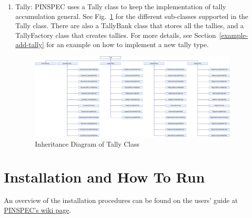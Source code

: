 \documentclass[titlepage]{article}
\newenvironment{Figure}[1][!t]
  {\begin{landscape}\thispagestyle{empty}\begin{figure}}
  {\end{figure}\null\vfill\centerline{\raisebox{-2cm}{\thepage}}\end{landscape}}
\begin{document}
\begin{enumerate}
\item Tally: PINSPEC uses a Tally class to keep the implementation of tally accumulation general. See Fig.~\ref{classTally} for the different sub-classes supported in the Tally class. There are also a TallyBank class that stores all the tallies, and a TallyFactory class that creates tallies. For more details, see Section~\ref{example-add-tally} for an example on how to implement a new tally type. 
  \begin{Figure}
    \vspace{-1in}
    \hspace{-1.45in}
    \includegraphics[width=2.\textwidth]{images/classTally.png}
    \caption{Inheritance Diagram of Tally Class} \label{classTally}
  \end{Figure}
\end{enumerate}




\clearpage
\section{Installation and How To Run} \label{install}
An overview of the installation procedures can be found on the users' guide at \href{https://github.com/mit-crpg/PINSPEC/wiki/Installing-PINSPEC}{PINSPEC's wiki page}. 
\end{document}
